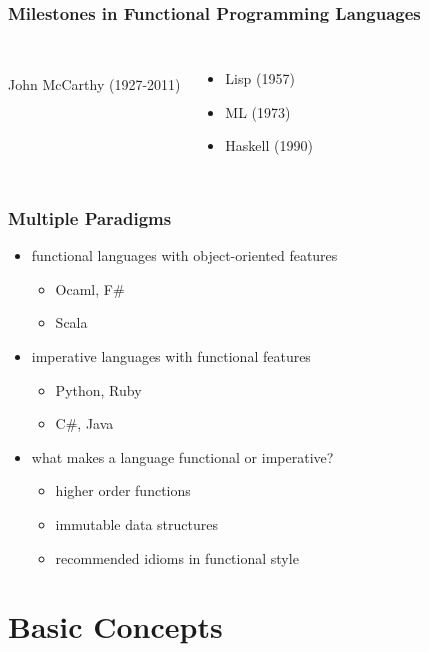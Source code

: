 \documentclass[dvipsnames]{beamer}
\theoremstyle{plain}
\begin{document}
\begin{frame}
  \frametitle{Milestones in Functional Programming Languages}

  \begin{columns}
    \begin{center}
      \\
      John McCarthy (1927-2011)
    \end{center}

    \begin{itemize}
      \item Lisp (1957)
      \item ML (1973)
      \item Haskell (1990)
    \end{itemize}
  \end{columns}
\end{frame}

\begin{frame}
  \frametitle{Multiple Paradigms}

  \begin{itemize}
    \item functional languages with object-oriented features
    \begin{itemize}
      \item Ocaml, F\#
      \item Scala
    \end{itemize}

    \medskip
    \item imperative languages with functional features
    \begin{itemize}
      \item Python, Ruby
      \item C\#, Java
    \end{itemize}

    \pause
    \bigskip
    \item what makes a language functional or imperative?
    \begin{itemize}
      \item higher order functions
      \item immutable data structures
      \item recommended idioms in functional style
    \end{itemize}
  \end{itemize}
\end{frame}

\section{Basic Concepts}
\end{document}
